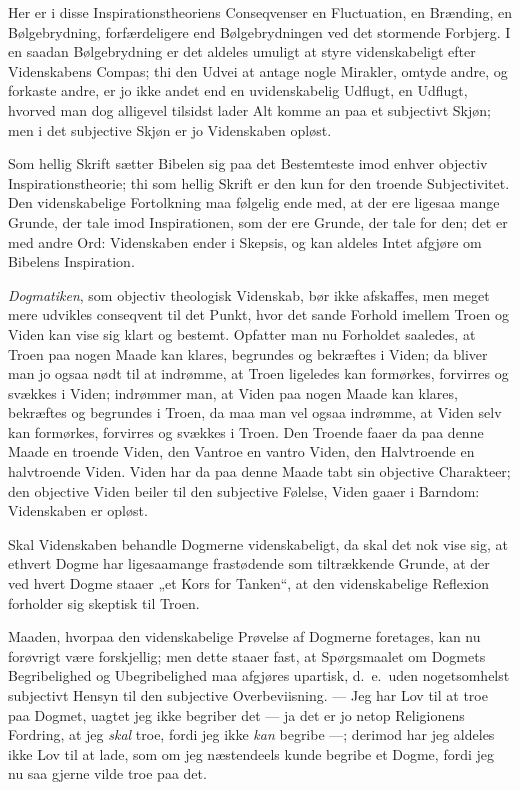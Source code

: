 \documentclass[12pt,a4paper]{book}
\newcommand{\opage}[1]{\marginnote{\footnotesize\textit{[#1]}}}
\begin{document}
Her er i disse Inspirationstheoriens Conseqvenser en Fluctuation, en Brænding,
en Bølgebrydning, forfærdeligere end
\opage{149} Bølgebrydningen ved det stormende Forbjerg. I en saadan Bølgebrydning er det
aldeles umuligt at styre videnskabeligt efter Videnskabens Compas; thi den Udvei
at antage nogle Mirakler, omtyde andre, og forkaste andre, er jo ikke andet end
en uvidenskabelig Udflugt, en Udflugt, hvorved man dog alligevel tilsidst lader
Alt komme an paa et subjectivt Skjøn; men i det subjective Skjøn er jo
Videnskaben opløst.

Som hellig Skrift sætter Bibelen sig paa det Bestemteste imod enhver objectiv
Inspirationstheorie; thi som hellig Skrift er den kun for den troende
Subjectivitet. Den videnskabelige Fortolkning maa følgelig ende med, at der ere
ligesaa mange Grunde, der tale imod Inspirationen, som der ere Grunde, der tale
for den; det er med andre Ord: Videnskaben ender i Skepsis, og kan aldeles Intet
afgjøre om Bibelens Inspiration.

\emph{Dogmatiken}, som objectiv theologisk Videnskab, bør ikke afskaffes, men
meget mere udvikles conseqvent til det Punkt, hvor det sande Forhold imellem
Troen og Viden kan vise sig klart og bestemt. Opfatter man nu Forholdet
saaledes, at Troen paa nogen Maade kan klares, begrundes og bekræftes i Viden;
da bliver man jo ogsaa nødt til at indrømme, at Troen ligeledes kan formørkes,
forvirres og svækkes i Viden; indrømmer man, at Viden paa nogen Maade kan
klares, bekræftes og begrundes i Troen, da maa man vel ogsaa indrømme, at Viden
selv kan formørkes, forvirres og svækkes i Troen. Den Troende faaer da paa denne
Maade en troende Viden, den Vantroe en vantro Viden, den Halvtroende en
halvtroende Viden. Viden har da paa denne Maade tabt sin objective Charakteer;
den objective Viden beiler til den subjective Følelse, Viden gaaer i Barndom:
Videnskaben er opløst.

Skal Videnskaben behandle Dogmerne videnskabeligt, da skal det nok vise sig, at
ethvert Dogme har ligesaamange frastødende som tiltrækkende Grunde, at der ved
hvert Dogme staaer
\opage{150} „et Kors for Tanken“, at den videnskabelige Reflexion forholder sig skeptisk til
Troen.

Maaden, hvorpaa den videnskabelige Prøvelse af Dogmerne foretages, kan nu
forøvrigt være forskjellig; men dette staaer fast, at Spørgsmaalet om Dogmets
Begribelighed og Ubegribelighed maa afgjøres upartisk, d.\ e.\ uden
nogetsomhelst subjectivt Hensyn til den subjective Overbeviisning. --- Jeg har
Lov til at troe paa Dogmet, uagtet jeg ikke begriber det --- ja det er jo netop
Religionens Fordring, at jeg \emph{skal} troe, fordi jeg ikke \emph{kan}
begribe ---; derimod har jeg aldeles ikke Lov til at lade, som om jeg
næstendeels kunde begribe et Dogme, fordi jeg nu saa gjerne vilde troe paa det.
\end{document}
